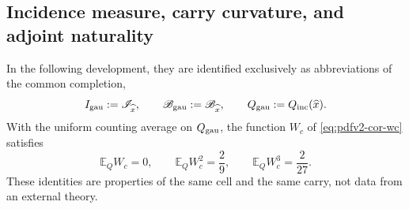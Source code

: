 \subsection{Incidence measure, carry curvature, and adjoint naturality}
In the following development, they are identified exclusively as abbreviations
of the common completion,
\[
 I_{\rm gau}:=\mathscr I_{\widehat x},\qquad
 \mathscr B_{\rm gau}:=\mathscr B_{\widehat x},\qquad
 Q_{\rm gau}:=Q_{\rm inc}(\widehat x).
\]
With the uniform counting average on \(Q_{\rm gau}\), the function
\(W_c\) of \eqref{eq:pdfv2-cor-wc} satisfies
\begin{equation}
\label{eq:pdfv2-cor-wc-momentos}
 \mathbb E_QW_c=0,\qquad
 \mathbb E_QW_c^2=\frac29,\qquad
 \mathbb E_QW_c^3=\frac{2}{27}.
\end{equation}
These identities are properties of the same cell and the same carry, not
data from an external theory.
\begingroup
  \let\section\subsection
  
\endgroup

